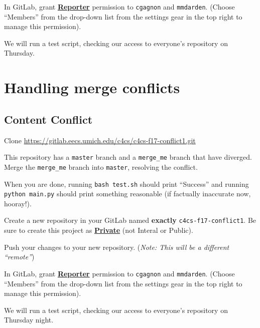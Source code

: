 \documentclass{article}
\begin{document}
In GitLab, grant \textbf{\ul{Reporter}} permission to \texttt{cgagnon} and
\texttt{mmdarden}.
(Choose ``Members'' from the drop-down list from the settings gear in the top
right to manage this permission).

We will run a test script, checking our access to everyone's repository on
Thursday.


\newpage
\section{Handling merge conflicts}

\subsection{Content Conflict}

Clone \url{https://gitlab.eecs.umich.edu/c4cs/c4cs-f17-conflict1.git}

This repository has a \texttt{master} branch and a \texttt{merge\_me} branch
that have diverged. Merge the \texttt{merge\_me} branch into \texttt{master},
resolving the conflict.

When you are done, running \texttt{bash test.sh} should print ``Success'' and
running \texttt{python main.py} should print something reasonable (if
factually inaccurate now, hooray!).

Create a new repository in your GitLab named \textbf{exactly}
\texttt{c4cs-f17-conflict1}.
Be sure to create this project as
\textbf{\ul{Private}} (not Interal or Public).

Push your changes to your new repository. (\emph{\small Note: This will be a
  different ``remote''})

In GitLab, grant \textbf{\ul{Reporter}} permission to \texttt{cgagnon} and
\texttt{mmdarden}.
(Choose ``Members'' from the drop-down list from the settings gear in the top
right to manage this permission).

We will run a test script, checking our access to everyone's repository on
Thursday night.
\end{document}
